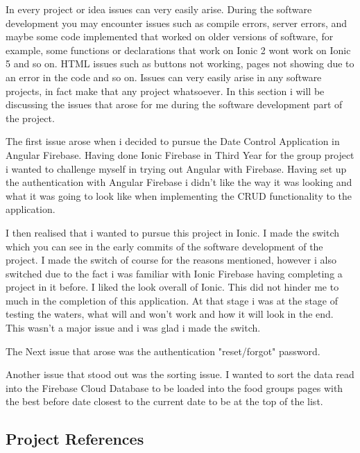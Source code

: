 In every project or idea issues can very easily arise. During the software development you may encounter issues such as compile errors, server errors, and maybe some code implemented that worked on older versions of software, for example, some functions or declarations that work on Ionic 2 wont work on Ionic 5 and so on. HTML issues such as buttons not working, pages not showing due to an error in the code and so on. Issues can very easily arise in any software projects, in fact make that any project whatsoever. In this section i will be discussing the issues that arose for me during the software development part of the project. 
\newline

The first issue arose when i decided to pursue the Date Control Application in Angular Firebase. Having done Ionic Firebase in Third Year for the group project i wanted to challenge myself in trying out Angular with Firebase. Having set up the authentication with Angular Firebase i didn't like the way it was looking and what it was going to look like when implementing the CRUD functionality to the application.
\newline

I then realised that i wanted to pursue this project in Ionic. I made the switch which you can see in the early commits of the software development of the project. I made the switch of course for the reasons mentioned, however i also switched due to the fact i was familiar with Ionic Firebase having completing a project in it before. I liked the look overall of Ionic. This did not hinder me to much in the completion of this application. At that stage i was at the stage of testing the waters, what will and won't work and how it will look in the end. This wasn't a major issue and i was glad i made the switch. 
\newline

The Next issue that arose was the authentication "reset/forgot" password. %
\newline

Another issue that stood out was the sorting issue. I wanted to sort the data read into the Firebase Cloud Database to be loaded into the food groups pages with the best before date closest to the current date to be at the top of the list. %

\subsection{Project References}
